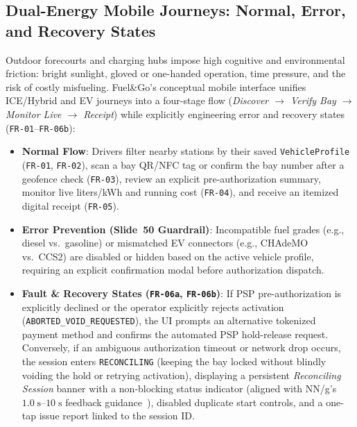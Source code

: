 

\subsection{Dual-Energy Mobile Journeys: Normal, Error, and Recovery States}
\label{sec:ux-journeys}

Outdoor forecourts and charging hubs impose high cognitive and environmental friction: bright sunlight, gloved or one-handed operation, time pressure, and the risk of costly misfueling. Fuel\&Go's conceptual mobile interface unifies ICE/Hybrid and EV journeys into a four-stage flow (\emph{Discover $\rightarrow$ Verify Bay $\rightarrow$ Monitor Live $\rightarrow$ Receipt}) while explicitly engineering error and recovery states (\texttt{FR-01}--\texttt{FR-06b}):

\begin{itemize}[leftmargin=1.4em, itemsep=2pt]
  \item \textbf{Normal Flow}: Drivers filter nearby stations by their saved \texttt{VehicleProfile} (\texttt{FR-01}, \texttt{FR-02}), scan a bay QR/NFC tag or confirm the bay number after a geofence check (\texttt{FR-03}), review an explicit pre-authorization summary, monitor live liters/kWh and running cost (\texttt{FR-04}), and receive an itemized digital receipt (\texttt{FR-05}).
  \item \textbf{Error Prevention (Slide~50 Guardrail)}: Incompatible fuel grades (e.g., diesel vs.\ gasoline) or mismatched EV connectors (e.g., CHAdeMO vs.\ CCS2) are disabled or hidden based on the active vehicle profile, requiring an explicit confirmation modal before authorization dispatch.
  \item \textbf{Fault \& Recovery States (\texttt{FR-06a}, \texttt{FR-06b})}: If PSP pre-authorization is explicitly declined or the operator explicitly rejects activation (\texttt{ABORTED\_VOID\_REQUESTED}), the UI prompts an alternative tokenized payment method and confirms the automated PSP hold-release request. Conversely, if an ambiguous authorization timeout or network drop occurs, the session enters \texttt{RECONCILING} (keeping the bay locked without blindly voiding the hold or retrying activation), displaying a persistent \emph{Reconciling Session} banner with a non-blocking status indicator (aligned with NN/g's $1.0\;\text{s}$--$10\;\text{s}$ feedback guidance~\cite{nielsen1993responsetimes}), disabled duplicate start controls, and a one-tap issue report linked to the session ID.
\end{itemize}


